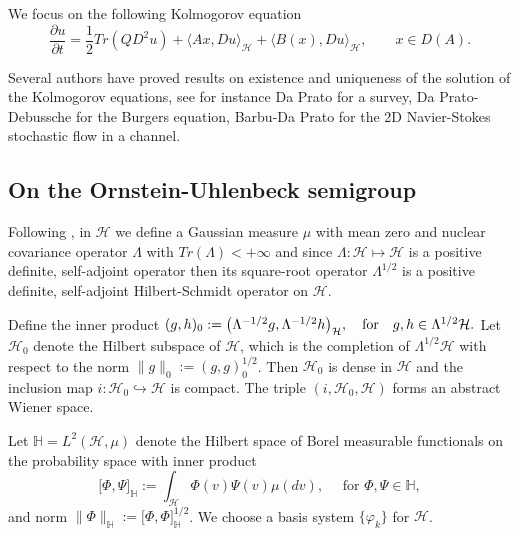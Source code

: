 \documentclass[review,onefignum,onetabnum]{siamart190516}
\begin{document}
    We focus on the following Kolmogorov equation
    \begin{equation}
        \label{P1s2.3}
        \frac{\partial u}{\partial t}
            = \frac{1}{2} Tr(QD^2u)
            + \langle Ax, Du
                \rangle_\mathcal{H} 
            + \langle B(x),Du \rangle_\mathcal{H},
            \qquad x\in D(A).
    \end{equation}

        Several authors have proved results on existence and uniqueness of the
    solution of the Kolmogorov equations, see for instance Da Prato \cite{da} 
    for a survey, Da Prato-Debussche \cite{da-de} for the Burgers equation,  
    Barbu-Da Prato \cite{ba-da} for the 2D Navier-Stokes stochastic flow in a 
    channel.
%
    \subsection{On the Ornstein-Uhlenbeck semigroup}
        \label{OUS-sect}
        Following \cite{liu},  in $\mathcal{H}$ we define a Gaussian measure 
        $\mu$ with mean zero and nuclear covariance operator $\Lambda$ with
        ${Tr(\Lambda)<+\infty}$ and since 
        $
            \Lambda:\mathcal{H}\mapsto \mathcal{H}
        $ 
    is a positive definite, self-adjoint operator then its square-root operator
    $\Lambda^{1/2}$ is a positive definite, self-adjoint Hilbert-Schmidt 
    operator on $\mathcal{H}$.

        Define the inner product
    $
        ( g, h )_0 := 
        \big( 
            \Lambda^{-1/2}g ,
            \Lambda^{-1/2} h
        \big)_\mathcal{H},
        \quad 
        \hbox{\rm for}
        \quad g, h \in 
        \Lambda^{1/2} 
        \mathcal{H}.
    $
    Let $\mathcal{H}_0$ denote the Hilbert subspace of $\mathcal{H}$, which is 
    the completion of $\Lambda^{1/2} \mathcal{H}$ with respect to the norm
    $\|g\|_0:= ( g, g )_0^{1/2} $. Then ${\mathcal{H}_0}$ is
    dense in $\mathcal{H}$ and the inclusion map
    $i:\mathcal{H}_0\hookrightarrow\mathcal{H}$ is compact. The triple
    $(i,\mathcal{H}_0,\mathcal{H})$ forms an abstract Wiener space.

    Let
    $
        \mathbb{H} = L^2 (\mathcal{H}, \mu)
    $
    denote the Hilbert space of Borel
    measurable functionals on the probability space with inner
    product
    \[
        \big[ 
            \Phi,
            \Psi
        \big]_\mathbb{H}
        :=
            \int_{\mathcal{H}} 
            \Phi(v)
            \Psi(v)\mu(dv),\quad
            \text{ for } 
            \Phi,\Psi\in\mathbb{H},
    \]
    and norm 
    $\|\Phi\|_{\mathbb{H}}:=\big [\Phi,\Phi\big ]_\mathbb{H}^{1/2}$.
    We choose a basis system $\{\varphi_k\}$ for $\mathcal{H}$.
\end{document}
